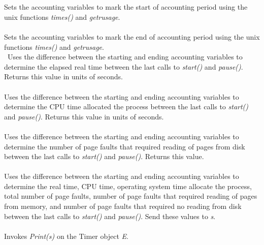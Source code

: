   \\
\\
Sets the accounting variables to mark the start of accounting period
using the unix functions {\em times()} and {\em getrusage}.\\

\\
Sets the accounting variables to mark the end of accounting period
using the unix functions {\em times()} and {\em getrusage}.\\


\
Uses the difference between the starting and ending accounting
variables to determine the elapsed real time between the last calls to
{\em start()} and {\em pause()}. Returns this value in units of seconds.\\

\\
Uses the difference between the starting and ending accounting
variables to determine the CPU time allocated the process between the
last calls to {\em start()} and {\em pause()}. Returns this value in
units of seconds.\\

\\
Uses the difference between the starting and ending accounting
variables to determine the number of page faults that required reading
of pages from disk between the last calls to {\em start()} and {\em
pause()}. Returns this value. \\


\\
Uses the difference between the starting and ending accounting
variables to determine the real time, CPU time, operating system time
allocate the process, total number of page faults, number of page
faults that required reading of pages from memory, and number of page
faults that required no reading from disk between the last calls to
{\em start()} and {\em pause()}. Send these values to {\em s}. \\

\\
Invokes {\em Print(s)} on the Timer object {\em E}. 

